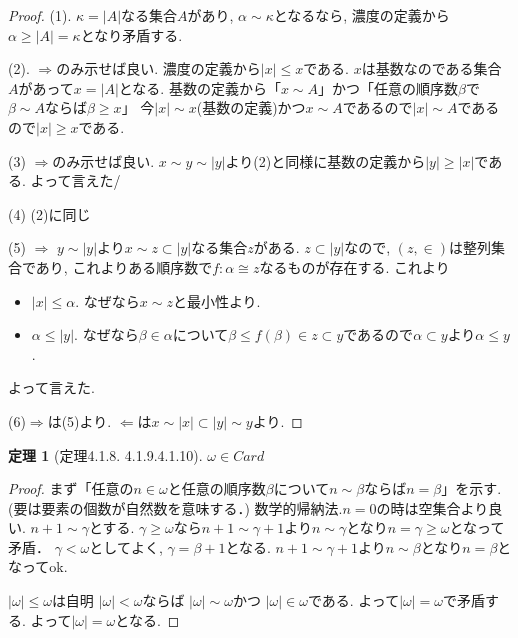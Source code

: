 \documentclass[dvipdfmx,a4paper,11pt]{report}
\theoremstyle{definition}
\newtheorem{thm}{定理}
\begin{document}
\begin{proof}
(1). $\kappa = |A|$なる集合$A$があり, $\alpha  \sim \kappa$となるなら, 濃度の定義から$\alpha \ge |A| = \kappa$となり矛盾する.

(2). $\Rightarrow$のみ示せば良い. 
濃度の定義から$|x| \le x$である. 
$x$は基数なのである集合$A$があって$x=|A|$となる. 
基数の定義から「$x \sim A$」かつ「任意の順序数$\beta$で$\beta \sim A$ならば$\beta \ge x$」
今$|x|\sim x$(基数の定義)かつ$x \sim A$であるので$|x| \sim A$であるので$|x| \ge x$である. 

(3) $\Rightarrow$のみ示せば良い. 
$x \sim y \sim |y|$より(2)と同様に基数の定義から$|y|\ge |x|$である. よって言えた/ 

(4) (2)に同じ

(5)  $\Rightarrow$ $y \sim |y|$より$x \sim z \subset |y|$なる集合$z$がある. 
$z \subset |y|$なので, $(z, \in)$は整列集合であり, これよりある順序数で$f: \alpha \cong z$なるものが存在する. これより
\begin{itemize}
\item $|x| \le \alpha$. なぜなら$x \sim z$と最小性より.
\item $\alpha \le |y|$. なぜなら$\beta \in \alpha$について$\beta \le f(\beta) \in z \subset y$であるので$\alpha \subset y$より$\alpha \le y$.
\end{itemize}
よって言えた. 

(6)$\Rightarrow$は(5)より. 
$\Leftarrow$は$x \sim |x| \subset |y| \sim y$より. 
\end{proof}

 \begin{tcolorbox}
 [colback = white, colframe = green!35!black, fonttitle = \bfseries,breakable = true]
\begin{thm}[定理4.1.8. 4.1.9.4.1.10]
$\omega \in Card$
\end{thm}
\end{tcolorbox}
\begin{proof}
まず「任意の$n \in \omega$と任意の順序数$\beta$について$n \sim \beta$ならば$n=\beta$」を示す.(要は要素の個数が自然数を意味する．)
数学的帰納法.$n=0$の時は空集合より良い. 
$n+1\sim \gamma$とする. 
$\gamma \ge \omega$なら$n+1 \sim \gamma +1$より$n\sim \gamma$となり$n=\gamma \ge \omega$となって矛盾．
$\gamma <\omega$としてよく, $\gamma = \beta +1$となる. 
$n+1 \sim \gamma +1$より$n\sim \beta$となり$n=\beta$となってok.

$|\omega| \le \omega$は自明
$|\omega| < \omega$ならば
$|\omega| \sim \omega$かつ $|\omega| \in \omega$である.
よって$|\omega| =\omega$で矛盾する. 
よって$|\omega| =\omega$となる. 
\end{proof}
\end{document}

